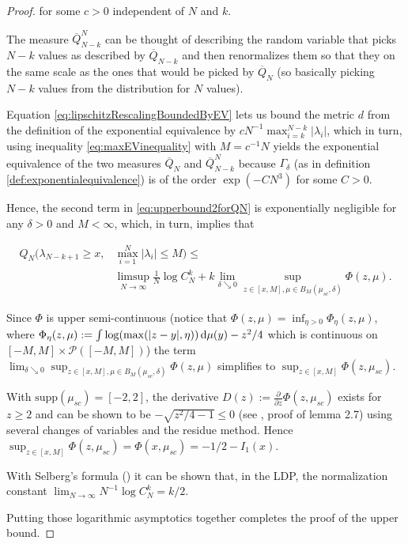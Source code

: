 \begin{proof}
	for some $c>0$ independent of $N$ and $k$. 
	
	The measure $\overline Q_{N-k}^N$ can be thought of describing the random variable that picks $N-k$ values as described by $\overline Q_{N-k}$ and then renormalizes them so that they on the same scale as the ones that would be picked by $\overline Q_N$ (so basically picking $N-k$ values from the distribution for $N$ values).
	
	Equation \ref{eq:lipschitzRescalingBoundedByEV} lets us bound the metric $d$ from the definition of the exponential equivalence by $cN^{-1}\max_{i=k}^{N-k}|\lambda_i|$, which in turn, using inequality \ref{eq:maxEVinequality} with $M=c^{-1}N$ yields the exponential equivalence of the two measures $\overline Q_N$ and $\overline Q_{N-k}^N$ because $\Gamma_\delta$ (as in definition \ref{def:exponentialequivalence}) is of the order $\exp(-CN^3)$ for some $C>0$.
	
	Hence, the second term in \ref{eq:upperbound2forQN} is exponentially negligible for any $\delta >0$ and $M<\infty$, which, in turn, implies that
	
	\begin{align}
		Q_N(\lambda_{N-k+1}\geq x,&\max_{i=1}^N|\lambda_i|\leq M)\leq \nonumber\\
		&\limsup_{N\rightarrow\infty}\frac{1}{N}\log C_N^k + k\lim_{\delta\searrow 0}\sup_{z\in[x,M],\mu\in B_M(\mu_{sc},\delta)}\Phi(z,\mu).
	\end{align}
	
	Since $\Phi$ is upper semi-continuous (notice that $\Phi(z,\mu)=\inf_{\eta>0}\Phi_{\eta}(z,\mu)$, where $\Phi_{\eta}(z,\mu) := \int \log(\max(|z-y|,\eta))\mathop{}\!\mathrm{d}\mu(y)-z^2/4$ which is continuous on $[-M,M]\times\mathcal P([-M,M])$) the term $\lim_{\delta\searrow 0}\sup_{z\in[x,M],\mu\in B_M(\mu_{sc},\delta)}\Phi(z,\mu)$ simplifies to $\sup_{z\in[x,M]}\Phi(z,\mu_{sc})$.
	
	With $\text{supp}(\mu_{sc})=[-2,2]$, the derivative $D(z):=\frac{\partial}{\partial z}\Phi(z,\mu_{sc})$ exists for $z\geq 2$ and can be shown to be $-\sqrt{z^2/4-1}\leq 0$ (see \cite{ArousLDPforWSL}, proof of lemma 2.7) using several changes of variables and the residue method. Hence $\sup_{z\in[x,M]}\Phi(z,\mu_{sc}) = \Phi(x,\mu_{sc})=-1/2-I_1(x)$.
	
	With Selberg's formula (\cite{Mehta2004random}) it can be shown that, in the LDP, the normalization constant $\lim_{N\rightarrow\infty}N^{-1}\log C_N^k = k/2$.
	
	Putting those logarithmic asymptotics together completes the proof of the upper bound.
	

\end{proof}
